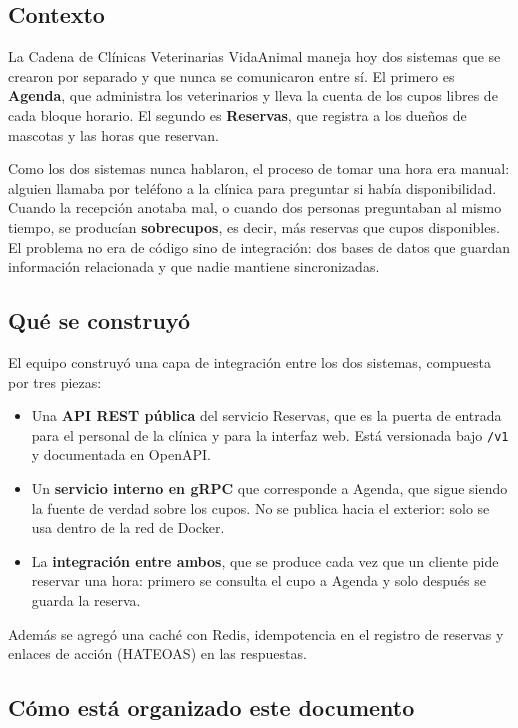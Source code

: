 \documentclass[12pt, a4paper]{article}
\begin{document}
\subsection{Contexto}

La Cadena de Clínicas Veterinarias VidaAnimal maneja hoy dos sistemas
que se crearon por separado y que nunca se comunicaron entre sí. El
primero es \textbf{Agenda}, que administra los veterinarios y lleva la
cuenta de los cupos libres de cada bloque horario. El segundo es
\textbf{Reservas}, que registra a los dueños de mascotas y las horas que
reservan.

Como los dos sistemas nunca hablaron, el proceso de tomar una hora era
manual: alguien llamaba por teléfono a la clínica para preguntar si había
disponibilidad. Cuando la recepción anotaba mal, o cuando dos personas
preguntaban al mismo tiempo, se producían \textbf{sobrecupos}, es decir,
más reservas que cupos disponibles. El problema no era de código sino de
integración: dos bases de datos que guardan información relacionada y
que nadie mantiene sincronizadas.

\subsection{Qué se construyó}

El equipo construyó una capa de integración entre los dos sistemas,
compuesta por tres piezas:

\begin{itemize}[leftmargin=1.4cm]
    \item Una \textbf{API REST pública} del servicio Reservas, que es la
    puerta de entrada para el personal de la clínica y para la interfaz
    web. Está versionada bajo \texttt{/v1} y documentada en OpenAPI.
    \item Un \textbf{servicio interno en gRPC} que corresponde a Agenda, que
    sigue siendo la fuente de verdad sobre los cupos. No se publica hacia
    el exterior: solo se usa dentro de la red de Docker.
    \item La \textbf{integración entre ambos}, que se produce cada vez que
    un cliente pide reservar una hora: primero se consulta el cupo a Agenda
    y solo después se guarda la reserva.
\end{itemize}

Además se agregó una caché con Redis, idempotencia en el registro de
reservas y enlaces de acción (HATEOAS) en las respuestas.

\subsection{Cómo está organizado este documento}
\end{document}

